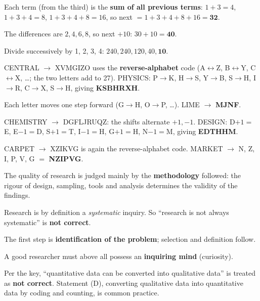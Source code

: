 Each term (from the third) is the \textbf{sum of all previous terms}: $1+3=4$, $1+3+4=8$, $1+3+4+8=16$, so next $=1+3+4+8+16=\mathbf{32}$.

The differences are $2, 4, 6, 8$, so next $+10$: $30+10=\mathbf{40}$.

Divide successively by 1, 2, 3, 4: $240, 240, 120, 40, \mathbf{10}$.

CENTRAL $\rightarrow$ XVMGIZO uses the \textbf{reverse-alphabet} code (A$\leftrightarrow$Z, B$\leftrightarrow$Y, C$\leftrightarrow$X, \ldots; the two letters add to 27).
PHYSICS: P$\rightarrow$K, H$\rightarrow$S, Y$\rightarrow$B, S$\rightarrow$H, I$\rightarrow$R, C$\rightarrow$X, S$\rightarrow$H, giving \textbf{KSBHRXH}.

Each letter moves one step forward (G$\rightarrow$H, O$\rightarrow$P, \ldots). LIME $\rightarrow$ \textbf{MJNF}.

CHEMISTRY $\rightarrow$ DGFLJRUQZ: the shifts alternate $+1, -1$.
DESIGN: D$+1=$E, E$-1=$D, S$+1=$T, I$-1=$H, G$+1=$H, N$-1=$M, giving \textbf{EDTHHM}.

CARPET $\rightarrow$ XZIKVG is again the reverse-alphabet code. MARKET $\rightarrow$ N, Z, I, P, V, G $=$ \textbf{NZIPVG}.

The quality of research is judged mainly by the \textbf{methodology} followed: the rigour of design, sampling, tools and analysis determines the validity of the findings.

Research is by definition a \emph{systematic} inquiry. So ``research is not always systematic'' is \textbf{not correct}.

The first step is \textbf{identification of the problem}; selection and definition follow.

A good researcher must above all possess an \textbf{inquiring mind} (curiosity).

Per the key, ``quantitative data can be converted into qualitative data'' is treated as \textbf{not correct}. Statement (D), converting qualitative data into quantitative data by coding and counting, is common practice.

